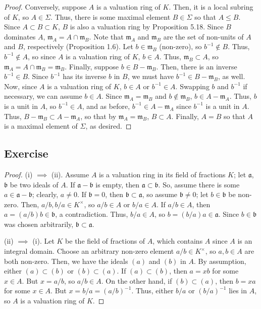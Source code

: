 \begin{proof}
Conversely, suppose $A$ is a valuation ring of $K$. Then, it is a local subring of $K$, so $A \in \Sigma$. Thus, there is some maximal element $B \in \Sigma$
so that $A \le B$. Since $A \subset B \subset K$, $B$ is also a valuation ring by Proposition 5.18. Since $B$ dominates $A$, $\mathfrak{m}_A = A \cap \mathfrak{m}_B$.
Note that $\mathfrak{m}_A$ and $\mathfrak{m}_B$ are the set of non-units of $A$ and $B$, respectively (Proposition 1.6). Let $b \in \mathfrak{m}_B$ (non-zero), so 
$b^{-1} \not\in B$. Thus, $b^{-1} \not\in A$, so since $A$ is a valuation ring of $K$, $b \in A$. Thus, $\mathfrak{m}_B \subset A$, so 
$\mathfrak{m}_A = A \cap \mathfrak{m}_B = \mathfrak{m}_B$. Finally, suppose $b \in B - \mathfrak{m}_B$. Then, there is an inverse $b^{-1} \in B$. Since $b^{-1}$
has its inverse $b$ in $B$, we must have $b^{-1} \in B - \mathfrak{m}_B$, as well. Now, since $A$ is a valuation ring of $K$, $b \in A$ or $b^{-1} \in A$. Swapping 
$b$ and $b^{-1}$ if necessary, we can assume $b \in A$. Since $\mathfrak{m}_A = \mathfrak{m}_B$ and $b \not\in \mathfrak{m}_B$, $b \in A - \mathfrak{m}_A$. Thus, $b$
is a unit in $A$, so $b^{-1} \in A$, and as before, $b^{-1} \in A - \mathfrak{m}_A$ since $b^{-1}$ is a unit in $A$. Thus, $B - \mathfrak{m}_B \subset A - \mathfrak{m}_A$,
so that by $\mathfrak{m}_A = \mathfrak{m}_B$, $B \subset A$. Finally, $A = B$ so that $A$ is a maximal element of $\Sigma$, as desired.
\end{proof}

\subsection{Exercise}\label{5.28}

\begin{proof}
(i) $\implies$ (ii). Assume $A$ is a valuation ring in its field of fractions $K$; let $\mathfrak{a}$, $\mathfrak{b}$ be two ideals of $A$. If 
$\mathfrak{a} - \mathfrak{b}$ is empty, then $\mathfrak{a} \subset \mathfrak{b}$. So, assume there is some $a \in \mathfrak{a} - \mathfrak{b}$;
clearly, $a \neq 0$. If $\mathfrak{b} = 0$, then $\mathfrak{b} \subset \mathfrak{a}$, so assume $\mathfrak{b} \neq 0$; let $b \in \mathfrak{b}$
be non-zero. Then, $a/b , b/a \in K^{\times}$, so $a/b \in A$ or $b/a \in A$. If $a/b \in A$, then $a = (a/b)b \in \mathfrak{b}$, a contradiction.
Thus, $b/a \in A$, so $b = (b/a)a \in \mathfrak{a}$. Since $b \in \mathfrak{b}$ was chosen arbitrarily, $\mathfrak{b} \subset \mathfrak{a}$.

(ii) $\implies$ (i). Let $K$ be the field of fractions of $A$, which contains $A$ since $A$ is an integral domain. 
Choose an arbitrary non-zero element $a/b \in K^{\times}$, so $a,b \in A$ are both non-zero. Then, we have the ideals $(a)$
and $(b)$ in $A$. By assumption, either $(a) \subset (b)$ or $(b) \subset (a)$. If $(a) \subset (b)$, then $a = xb$ for some $x \in A$. But 
$x = a/b$, so $a/b \in A$. On the other hand, if $(b) \subset (a)$, then $b = xa$ for some $x \in A$. But $x = b/a = (a/b)^{-1}$. Thus, 
either $b/a$ or $(b/a)^{-1}$ lies in $A$, so $A$ is a valuation ring of $K$.
\end{proof}

